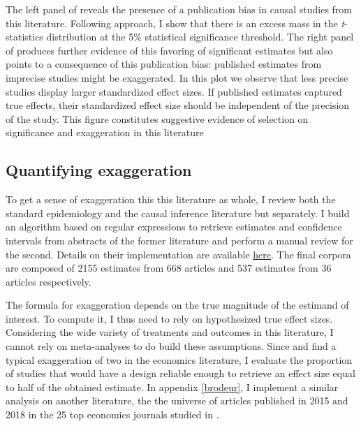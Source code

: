 \documentclass[usletter, 12pt]{article}
\begin{document}
                The left panel of  reveals the presence of a publication bias in causal studies from this literature. Following \cite{brodeur_star_2016, brodeur_methods_2020} approach, I show that there is an excess mass in the \textit{t}-statistics distribution at the 5\% statistical significance threshold. The right panel of  produces further evidence of this favoring of significant estimates but also  points to a consequence of this publication bias: published estimates from imprecise studies might be exaggerated. In this plot we observe that less precise studies display larger standardized effect sizes. If published estimates captured true effects, their standardized effect size should be independent of the precision of the study. This figure constitutes suggestive evidence of selection on significance and exaggeration in this literature
                
                \subsection{Quantifying exaggeration}
                
                		To get a sense of exaggeration this this literature as whole, I review both the standard epidemiology and the causal inference literature but separately. I build an algorithm based on regular expressions to retrieve estimates and confidence intervals from abstracts of the former literature and perform a manual review for the second. Details on their implementation are available \href{https://vincentbagilet.github.io/inference_pollution/std_lit_getting_abstracts.html}{here}. The final corpora are composed of 2155 estimates from 668 articles and 537 estimates from 36 articles respectively.

		 	The formula for exaggeration depends on the true magnitude of the estimand of interest. To compute it, I thus need to rely on hypothesized true effect sizes. Considering the wide variety of treatments and outcomes in this literature, I cannot rely on meta-analyses to do build these assumptions. Since \cite{ioannidis_power_2017} and \cite{ferraro_featureis_2020} find a typical exaggeration of two in the economics literature, I evaluate the proportion of studies that would have a design reliable enough to retrieve an effect size equal to half of the obtained estimate. In appendix \ref{brodeur}, I implement a similar analysis on another literature, the the universe of articles published in 2015 and 2018 in the 25 top economics journals studied in \cite{brodeur_methods_2020}.
						
\end{document}

